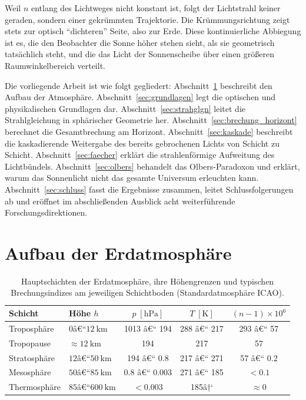 ﻿\documentclass[12pt,a4paper]{article}
\begin{document}
Weil $n$ entlang des Lichtweges nicht konstant ist,
folgt der Lichtstrahl keiner geraden, sondern einer gekrümmten
Trajektorie.
Die Krümmungsrichtung zeigt stets zur optisch ``dichteren'' Seite,
also zur Erde.
Diese kontinuierliche Abbiegung ist es, die den Beobachter
die Sonne höher stehen sieht, als sie geometrisch tatsächlich steht,
und die das Licht der Sonnenscheibe über einen größeren
Raumwinkelbereich verteilt.

Die vorliegende Arbeit ist wie folgt gegliedert:
Abschnitt~\ref{sec:schichten} beschreibt den Aufbau der Atmosphäre.
Abschnitt~\ref{sec:grundlagen} legt die optischen und physikalischen
Grundlagen dar.
Abschnitt~\ref{sec:strahglgn} leitet die Strahlgleichung in
sphärischer Geometrie her.
Abschnitt~\ref{sec:brechung_horizont} berechnet die
Gesamtbrechung am Horizont.
Abschnitt~\ref{sec:kaskade} beschreibt die kaskadierende Weitergabe
des bereits gebrochenen Lichts von Schicht zu Schicht.
Abschnitt~\ref{sec:faecher} erklärt die strahlenförmige Aufweitung
des Lichtbündels.
Abschnitt~\ref{sec:olbers} behandelt das Olbers-Paradoxon
und erklärt, warum das Sonnenlicht nicht das gesamte Universum
erleuchten kann.
Abschnitt~\ref{sec:schluss} fasst die Ergebnisse zusammen,
leitet Schlussfolgerungen ab und eröffnet im abschließenden
Ausblick acht weiterführende Forschungsdirektionen.

\section{Aufbau der Erdatmosphäre}
\label{sec:schichten}

\begin{table}[htbp]
\centering
\caption{Hauptschichten der Erdatmosphäre, ihre
         Höhengrenzen und typischen Brechungsindizes
         am jeweiligen Schichtboden (Standardatmosphäre ICAO).}
\label{tab:schichten}
\begin{tabular}{llccc}
\toprule
Schicht & Höhe $h$ & $p\;[\si{\hecto\pascal}]$ & $T\;[\si{\kelvin}]$ & $(n-1)\times 10^{6}$ \\
\midrule
Troposphäre       & $0$â€“$\SI{12}{\kilo\metre}$   & 1013 â€“ 194  & 288 â€“ 217 & 293 â€“ 57  \\
Tropopause        & $\approx\SI{12}{\kilo\metre}$ & 194         & 217       & 57        \\
Stratosphäre      & $12$â€“$\SI{50}{\kilo\metre}$  & 194 â€“ 0.8   & 217 â€“ 271 & 57 â€“ 0.2  \\
Mesosphäre        & $50$â€“$\SI{85}{\kilo\metre}$  & 0.8 â€“ 0.003 & 271 â€“ 185 & $<0.1$    \\
Thermosphäre      & $85$â€“$\SI{600}{\kilo\metre}$ & $<$0.003    & 185â†‘      & $\approx 0$\\
\bottomrule
\end{tabular}
\end{table}
\end{document}
